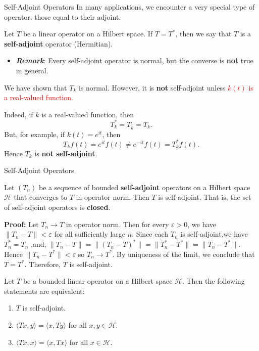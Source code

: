 \documentclass[9pt, aspectratio=169]{beamer}
\begin{document}
\begin{frame}{Self-Adjoint Operators}
In many applications, we encounter a very special type of operator: those equal to their adjoint. 
\begin{definition}
Let $T$ be a linear operator on a Hilbert space. If $T=T^*$, then we say that $T$ is a\textbf{ self-adjoint} operator (Hermitian).
\end{definition}
\pause
\begin{itemize}
    \item \textbf{\textit{Remark}}: Every self-adjoint operator is normal, but the converse is \textbf{not} true in general.
\end{itemize}
\begin{example}
We have shown that $T_k$ is normal. However, it is \textbf{not} self-adjoint unless \textcolor{red}{$k(t)$ is a real-valued function.}
\end{example}
\pause
Indeed, if $k$ is a real-valued function, then
\[
T_k^*=T_{\bar{k}}=T_k.
\]
But, for example, if $k(t)=e^{it}$, then
\[
T_kf(t)=e^{it}f(t)\neq e^{-it}f(t)=T_k^*f(t).
\]
Hence $T_k$ is \textbf{not self-adjoint}.
\end{frame}
\begin{frame}{Self-Adjoint Operators}
    \begin{tcolorbox}[colback=blue!5, colframe=blue!60!black, title=Theorem 3]
Let $(T_n)$ be a sequence of bounded \textbf{self-adjoint} operators on a Hilbert space $\mathcal{H}$ that converges to $T$ in operator norm. Then $T$ is self-adjoint. That is, the set of self-adjoint operators is \textbf{closed}.
\end{tcolorbox}
\pause
{\fontsize{9pt}{6pt}\selectfont
\textbf{Proof:} Let $T_n\to T$ in operator norm. Then for every $\varepsilon>0$, we have
$
\|T_n-T\|<\varepsilon
$ for all sufficiently large $n$. Since each $T_n$ is self-adjoint,we have $T_n^*=T_n$ ,and, $\|T_n-T\|=\|(T_n-T)^*\|=\|T_n^*-T^*\|=\|T_n-T^*\|.$
Hence
$\|T_n-T^*\|<\varepsilon$
so $T_n\to T^*$. By uniqueness of the limit, we conclude that
$
T=T^*.
$
Therefore, $T$ is self-adjoint.
}  \square

\pause

\begin{tcolorbox}[colback=blue!5, colframe=blue!60!black, title=Theorem 4]
Let $T$ be a bounded linear operator on a Hilbert space $\mathcal{H}$. Then the following statements are equivalent:
\begin{enumerate}
    \item $T$ is self-adjoint.
    \item $\langle Tx,y \rangle = \langle x,Ty \rangle$ for all $x,y \in \mathcal{H}$.
    \item $\langle Tx,x \rangle = \langle x,Tx \rangle$ for all $x \in \mathcal{H}$.
\end{enumerate}
\end{tcolorbox}
\end{frame}
\end{document}
